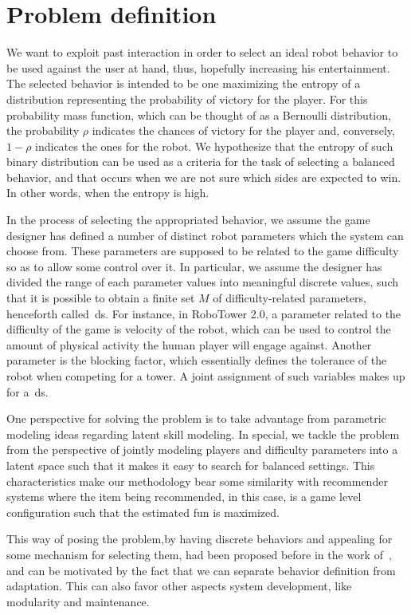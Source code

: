 \section{Problem definition}
We want to exploit past interaction in order to select an ideal robot behavior to be used against the user at hand, thus, hopefully increasing his entertainment. The selected behavior is intended to be one maximizing the entropy of a distribution representing the probability of victory for the player. For this probability mass function, which can be thought of as a Bernoulli distribution, the probability $\rho$ indicates the chances of victory for the player and, conversely, $1-\rho$ indicates the ones for the robot. We hypothesize that the entropy of such binary distribution can be used as a criteria for the task of selecting a balanced behavior, and that occurs when we are not sure which sides are expected to win. In other words, when the entropy is high.

In the process of selecting the appropriated behavior, we assume the game designer has defined a number of distinct robot parameters which the system can choose from. These parameters are supposed to be related to the game difficulty so as to allow some control over it. In particular, we assume the designer has divided the range of each parameter values into meaningful discrete values, such that it is possible to obtain a finite set $M$ of difficulty-related parameters, henceforth called~\gls{ds}. For instance, in RoboTower 2.0, a parameter related to the difficulty of the game is velocity of the robot, which can be used to control the amount of physical activity the human player will engage against. Another parameter is the blocking factor, which essentially defines the tolerance of the robot when competing for a tower. A joint assignment of such variables makes up for a~\gls{ds}. 

One perspective for solving the problem is to take advantage from parametric modeling ideas regarding latent skill modeling. In special, we tackle the problem from the perspective of jointly modeling players and difficulty parameters into a latent space such that it makes it easy to search for balanced settings. This characteristics make our methodology bear some similarity with recommender systems where the item being recommended, in this case, is a game level configuration such that the estimated fun is maximized. 

This way of posing the problem,\ie by having discrete behaviors and appealing for some mechanism for selecting them, had been proposed before in the work of~\cite{sejrsgaard-jacobsen_dynamic_2011}, and can be motivated by the fact that we can separate behavior definition from adaptation. This can also favor other aspects system development, like modularity and maintenance.

